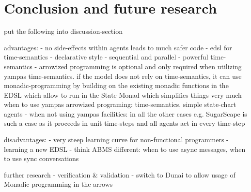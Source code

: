 \section{Conclusion and future research}

put the following into discussion-section

advantages:
	- no side-effects within agents leads to much safer code
	- edsl for time-semantics
	- declarative style
	- sequential and parallel
	- powerful time-semantics
	- arrowized programming is optional and only required when utilizing yampas time-semantics. if the model does not rely on time-semantics, it can use monadic-programming by building on the existing monadic functions in the EDSL which allow to run in the State-Monad which simplifies things very much
	- when to use yampas arrowized programing: time-semantics, simple state-chart agents 
	- when not using yampas facilities: in all the other cases e.g. SugarScape is such a case as it proceeds in unit time-steps and all agents act in every time-step
	
disadvantages:
	- very steep learning curve for non-functional programmers
	- learning a new EDSL
	- think ABMS different: when to use async messages, when to use sync conversations

further research
	- verification \& validation
	- switch to Dunai to allow usage of Monadic programming in the arrows